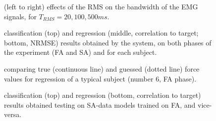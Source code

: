 \documentclass[10pt]{bmc_article}
\def\texttt{[image: ]}
\newenvironment{bmcformat}{\begin{raggedright}\baselineskip20pt\sloppy\setboolean{publ}{false}}{\end{raggedright}\baselineskip20pt\sloppy}
\begin{document}
\begin{bmcformat}
\begin{figure}[!ht] \centering
  \caption{(left to right) effects of the RMS on the bandwidth of the EMG
    signals, for $T_{RMS} = 20, 100, 500ms$.}
  \label{fig:RMSs}
\end{figure}


\begin{figure}[!ht] \centering
  \caption{classification (top) and regression (middle, correlation to target;
    bottom, NRMSE) results obtained
    by the system, on both phases of the experiment (FA and SA) and
    for each subject.}
  \label{fig:results}
\end{figure}

\begin{figure}[!ht] \centering
  \caption{comparing true (continuous line) and guessed (dotted line) force values for regression of a
    typical subject (number $6$, FA phase).}
  \label{fig:examples}
\end{figure}

\begin{figure}[!ht] \centering
   \caption{classification (top) and regression (bottom, correlation to target)
      results obtained testing on SA-data models trained on FA, and vice-versa.}
  \label{fig:2on1}
\end{figure}


\end{bmcformat}
\end{document}
